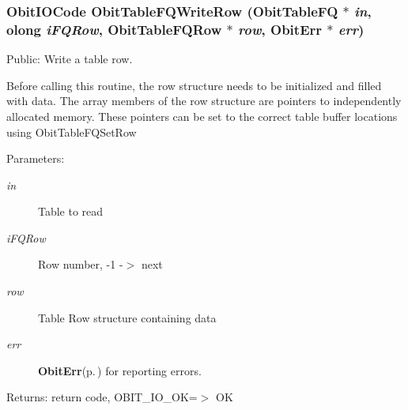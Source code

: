 \subsubsection{\setlength{\rightskip}{0pt plus 5cm}Obit\-IOCode Obit\-Table\-FQWrite\-Row ({\bf Obit\-Table\-FQ} $\ast$ {\em in}, {\bf olong} {\em i\-FQRow}, {\bf Obit\-Table\-FQRow} $\ast$ {\em row}, {\bf Obit\-Err} $\ast$ {\em err})}\label{ObitTableFQ_8c_a24}


Public: Write a table row. 

Before calling this routine, the row structure needs to be initialized and filled with data. The array members of the row structure are pointers to independently allocated memory. These pointers can be set to the correct table buffer locations using Obit\-Table\-FQSet\-Row \begin{Desc}
\item[Parameters:]
\begin{description}
\item[{\em in}]Table to read \item[{\em i\-FQRow}]Row number, -1 -$>$ next \item[{\em row}]Table Row structure containing data \item[{\em err}]{\bf Obit\-Err}{\rm (p.\,\pageref{structObitErr})} for reporting errors. \end{description}
\end{Desc}
\begin{Desc}
\item[Returns:]return code, OBIT\_\-IO\_\-OK=$>$ OK \end{Desc}
